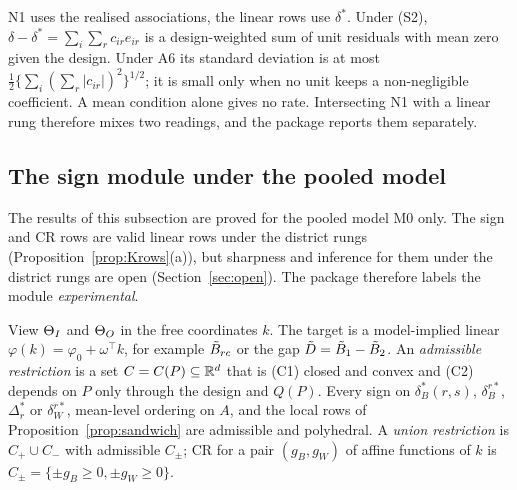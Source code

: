 \begin{remark}\label{rem:whichdelta}
N1 uses the realised associations, the linear rows use $\delta^*$. Under (S2),
$\delta-\delta^*=\sum_i\sum_rc_{ir}e_{ir}$ is a design-weighted sum of unit
residuals with mean zero given the design. Under A6 its standard deviation is at
most $\tfrac12\{\sum_i(\sum_r|c_{ir}|)^2\}^{1/2}$; it is small only when no unit
keeps a non-negligible coefficient. A mean condition alone gives no rate.
Intersecting N1 with a linear rung therefore mixes two readings, and the package
reports them separately.
\end{remark}

\subsection{The sign module under the pooled model}\label{sec:msign}

The results of this subsection are proved for the pooled model M0 only. The sign
and CR rows are valid linear rows under the district rungs
(Proposition~\ref{prop:Krows}(a)), but sharpness and inference for them under the
district rungs are open (Section~\ref{sec:open}). The package therefore labels
the module \emph{experimental}.

View $\Theta_I$ and $\Theta_O$ in the free coordinates $k$. The target is a model-implied
linear $\varphi(k)=\varphi_0+\omega^\top k$, for example $\tilde B_{rc}$ or the gap
$\tilde D=\tilde B_1-\tilde B_2$. An \emph{admissible restriction} is a set
$C=C(P)\subseteq\mathbb R^d$ that is (C1) closed and convex and (C2) depends on $P$ only
through the design and $Q(P)$. Every sign on $\delta^*_B(r,s)$, $\delta^{r*}_B$,
$\Delta^*_r$ or $\delta^{r*}_W$, mean-level ordering on $A$, and the local rows of
Proposition~\ref{prop:sandwich} are admissible and polyhedral. A \emph{union
restriction} is $C_+\cup C_-$ with admissible $C_\pm$; CR for a pair $(g_B,g_W)$
of affine functions of $k$ is $C_\pm=\{\pm g_B\ge0,\pm g_W\ge0\}$.

